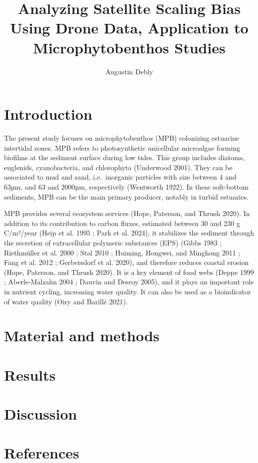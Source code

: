 \documentclass[
  letterpaper,
  DIV=11,
  numbers=noendperiod]{scrartcl}
\title{Analyzing Satellite Scaling Bias Using Drone Data, Application to
Microphytobenthos Studies}
\author{Augustin Debly}
\date{}
\begin{document}
\maketitle

\section{Introduction}\label{introduction}

The present study focuses on microphytobenthos (MPB) colonizing
estuarine intertidal zones. MPB refers to photosynthetic unicellular
microalgae forming biofilms at the sediment surface during low tides.
This group includes diatoms, euglenids, cyanobacteria, and chlorophyta
(Underwood 2001). They can be associated to mud and sand, i.e.~inorganic
particles with size between 4 and 63µm, and 63 and 2000µm, respectively
(Wentworth 1922). In these soft-bottom sediments, MPB can be the main
primary producer, notably in turbid estuaries.

MPB provides several ecosystem services (Hope, Paterson, and Thrush
2020). In addition to its contribution to carbon fluxes, estimated
between 30 and 230 g C/m²/year (Heip et al. 1995 ; Park et al. 2024), it
stabilizes the sediment through the secretion of extracellular polymeric
substances (EPS) (Gibbs 1983 ; Riethmüller et al. 2000 ; Stal 2010 ;
Huiming, Hongwei, and Minghong 2011 ; Fang et al. 2012 ; Gerbersdorf et
al. 2020), and therefore reduces coastal erosion (Hope, Paterson, and
Thrush 2020). It is a key element of food webs (Deppe 1999 ;
Aberle-Malzahn 2004 ; Dauvin and Desroy 2005), and it plays an important
role in nutrient cycling, increasing water quality. It can also be used
as a bioindicator of water quality (Oiry and Barillé 2021).

\section{Material and methods}\label{material-and-methods}

\section{Results}\label{results}

\section{Discussion}\label{discussion}

\section*{References}\label{references}
\end{document}
